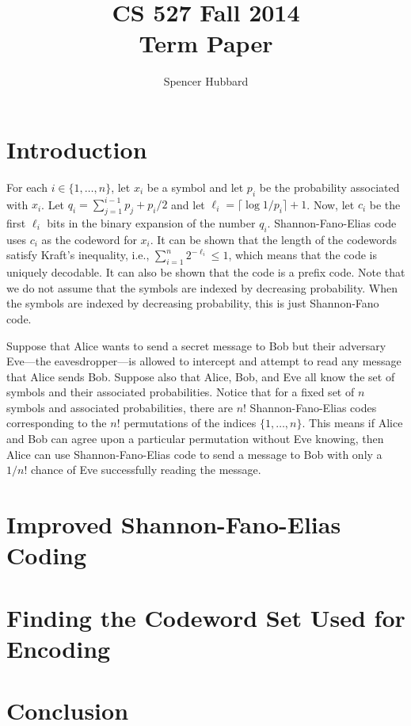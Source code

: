 \documentclass[10pt,letterpaper,notitlepage,draft]{article}
\title{CS 527 Fall 2014\\Term Paper}
\author{Spencer Hubbard} %
\date{} %
\theoremstyle{definition}
\begin{document}
\maketitle


\section{Introduction}
For each $i \in \lbrace 1, \ldots, n\rbrace$, let $x_i$ be a symbol and let $p_i$ be the probability associated with $x_i$. Let $q_i = \sum_{j=1}^{i-1} p_j + p_i / 2$ and let $\ell_i = \lceil\log 1 / p_i \rceil + 1$. Now, let $c_i$ be the first $\ell_i$ bits in the binary expansion of the number $q_i$. Shannon-Fano-Elias code uses $c_i$ as the codeword for $x_i$. It can be shown that the length of the codewords satisfy Kraft's inequality, i.e., $\sum_{i = 1}^n 2^{-\ell_i} \le 1$, which means that the code is uniquely decodable. It can also be shown that the code is a prefix code. Note that we do not assume that the symbols are indexed by decreasing probability. When the symbols are indexed by decreasing probability, this is just Shannon-Fano code.

Suppose that Alice wants to send a secret message to Bob but their adversary Eve---the eavesdropper---is allowed to intercept and attempt to read any message that Alice sends Bob. Suppose also that Alice, Bob, and Eve all know the set of symbols and their associated probabilities. Notice that for a fixed set of $n$ symbols and associated probabilities, there are $n!$ Shannon-Fano-Elias codes corresponding to the $n!$ permutations of the indices $\lbrace 1, \dots, n\rbrace$. This means if Alice and Bob can agree upon a particular permutation without Eve knowing, then Alice can use Shannon-Fano-Elias code to send a message to Bob with only a $1/n!$ chance of Eve successfully reading the message.

\section{Improved Shannon-Fano-Elias Coding}

\section{Finding the Codeword Set Used for Encoding}

\section{Conclusion}

%
%
\end{document}
